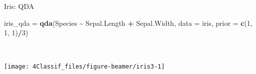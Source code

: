 \documentclass[
  10pt,
  ignorenonframetext,
]{beamer}
\newenvironment{Shaded}{\begin{snugshade}}{\end{snugshade}}
\newcommand{\AttributeTok}[1]{\textcolor[rgb]{0.13,0.29,0.53}{#1}}
\newcommand{\DecValTok}[1]{\textcolor[rgb]{0.00,0.00,0.81}{#1}}
\newcommand{\FunctionTok}[1]{\textcolor[rgb]{0.13,0.29,0.53}{\textbf{#1}}}
\newcommand{\NormalTok}[1]{#1}
\newcommand{\OtherTok}[1]{\textcolor[rgb]{0.56,0.35,0.01}{#1}}
\newcommand{\SpecialCharTok}[1]{\textcolor[rgb]{0.81,0.36,0.00}{\textbf{#1}}}
\begin{document}
\begin{frame}[fragile]
\begin{block}{Iris: QDA}
\protect\hypertarget{iris-qda}{}
\scriptsize

\begin{Shaded}
\begin{Highlighting}[]
\NormalTok{iris\_qda }\OtherTok{=} \FunctionTok{qda}\NormalTok{(Species }\SpecialCharTok{\textasciitilde{}}\NormalTok{ Sepal.Length }\SpecialCharTok{+}\NormalTok{ Sepal.Width, }\AttributeTok{data =}\NormalTok{ iris, }\AttributeTok{prior =} \FunctionTok{c}\NormalTok{(}\DecValTok{1}\NormalTok{,}
    \DecValTok{1}\NormalTok{, }\DecValTok{1}\NormalTok{)}\SpecialCharTok{/}\DecValTok{3}\NormalTok{)}
\end{Highlighting}
\end{Shaded}

\(~\)

\begin{center}\texttt{[image: 4Classif\_files/figure-beamer/iris3-1]} \end{center}
\end{block}
\end{frame}
\end{document}
